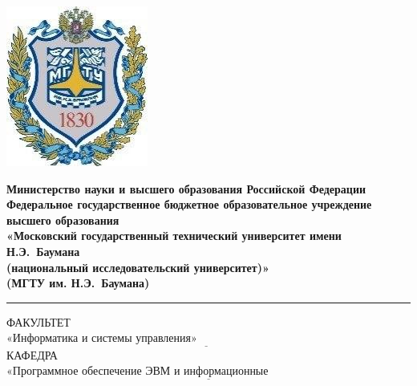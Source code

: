 
\begin{titlepage}
	\fontsize{12pt}{12pt}\selectfont
	\noindent \begin{minipage}{0.15\textwidth}
		\includegraphics[width=\linewidth]{assets/b_logo.jpg}
	\end{minipage}
	\noindent\begin{minipage}{0.9\textwidth}\centering
		\textbf{Министерство науки и высшего образования Российской Федерации}\\
		\textbf{Федеральное государственное бюджетное образовательное учреждение высшего образования}\\
		\textbf{«Московский государственный технический университет имени Н.Э.~Баумана}\\
		\textbf{(национальный исследовательский университет)»}\\
		\textbf{(МГТУ им. Н.Э.~Баумана)}
	\end{minipage}
	
	\noindent\rule{18cm}{3pt}
	\newline\newline
	\noindent ФАКУЛЬТЕТ $\underline{\text{«Информатика и системы управления»~~~~~~~~~~~~~~~~~~~~~~~~~~~~~~~~~~~~~~~~~~~~~~~~~~~~~~~~}}$ \newline\newline
	\noindent КАФЕДРА $\underline{\text{«Программное обеспечение ЭВМ и информационные технологии»~~~~~~~~~~~~~~~~~~~~~~~}}$\newline\newline\newline\newline\newline\newline\newline
	

\end{titlepage}
